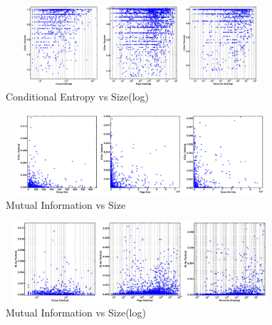\begin{figure}
\centering
\includegraphics[width=100mm, height=30mm]{data/CEvsSizeLog.eps}
\caption{Conditional Entropy vs Size(log)}
\label{Fig: Conditional Entropy vs Size(Log)}
\end{figure}

\pagebreak


\begin{figure}
\centering
\includegraphics[width=100mm, height=30mm]{data/MIvsSize.eps}
\caption {Mutual Information vs Size}
\label {Fig: Mutual Information vs Size}
\end{figure}

\begin{figure}
\centering
\includegraphics[width=100mm, height=30mm]{data/MIvsSizelog.eps}
\caption{Mutual Information  vs Size(log)}
\label {Fig: Mutual Information vs Size(log)}
\end{figure}



